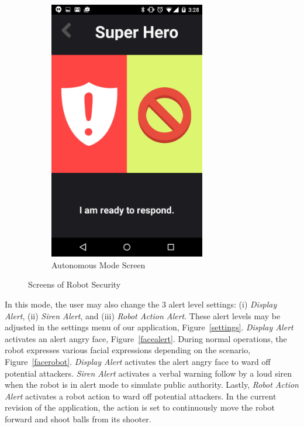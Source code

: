 \documentclass[12pt]{article}
\begin{document}
\begin{figure}[!htbp]
\begin{subfigure}[b]{0.45\textwidth}
    \includegraphics[width=0.75\textwidth]{superhero.png}
    \caption{Autonomous Mode Screen}
    \label{superhero}
    \end{subfigure}
    \caption{Screens of Robot Security}
    \label{screens}
\end{figure}
\pagebreak
In this mode, the user may also change the 3 alert level settings: (i) \textit{Display Alert}, (ii) \textit{Siren Alert}, and (iii) \textit{Robot Action Alert}. These alert levels may be adjusted in the settings menu of our application, Figure~\ref{settings}. \textit{Display Alert} activates an alert angry face, Figure~\ref{facealert}. During normal operations, the robot expresses various facial expressions depending on the scenario, Figure~\ref{facerobot}. \textit{Display Alert} activates the alert angry face to ward off potential attackers. \textit{Siren Alert} activates a verbal warning follow by a loud siren when the robot is in alert mode to simulate public authority. Lastly, \textit{Robot Action Alert} activates a robot action to ward off potential attackers. In the current revision of the application, the action is set to continuously move the robot forward and shoot balls from its shooter.
\end{document}
